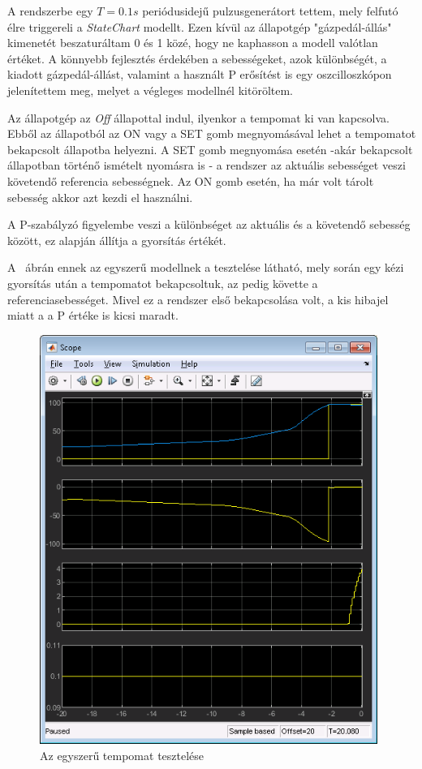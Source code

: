 A rendszerbe egy $T=0.1s$ periódusidejű pulzusgenerátort tettem, mely felfutó élre triggereli a \textit{StateChart} modellt. Ezen kívül az állapotgép "gázpedál-állás" kimenetét beszaturáltam 0 és 1 közé, hogy ne kaphasson a modell valótlan értéket. A könnyebb fejlesztés érdekében a sebességeket, azok különbségét, a kiadott gázpedál-állást, valamint a használt P erősítést is egy oszcilloszkópon jelenítettem meg, melyet a végleges modellnél kitöröltem.

Az állapotgép az \textit{Off} állapottal indul, ilyenkor a tempomat ki van kapcsolva. Ebből az állapotból az ON vagy a SET gomb megnyomásával lehet a tempomatot bekapcsolt állapotba helyezni. A SET gomb megnyomása esetén -akár bekapcsolt állapotban történő ismételt nyomásra is - a rendszer az aktuális sebességet veszi követendő referencia sebességnek. Az ON gomb esetén, ha már volt tárolt sebesség akkor azt kezdi el használni.

A P-szabályzó figyelembe veszi a különbséget az aktuális és a követendő sebesség között, ez alapján állítja a gyorsítás értékét.

A ~ábrán ennek az egyszerű modellnek a tesztelése látható, mely során egy kézi gyorsítás után a tempomatot bekapcsoltuk, az pedig követte a referenciasebességet. Mivel ez a rendszer első bekapcsolása volt, a kis hibajel miatt a a P értéke is kicsi maradt. 

\begin{figure}[!ht]
\centering
\includegraphics[width=110mm,keepaspectratio]{figures/2m04/f2_scope_2.png}
\caption{Az egyszerű tempomat tesztelése}
\label{fig:scope1}
\end{figure}

